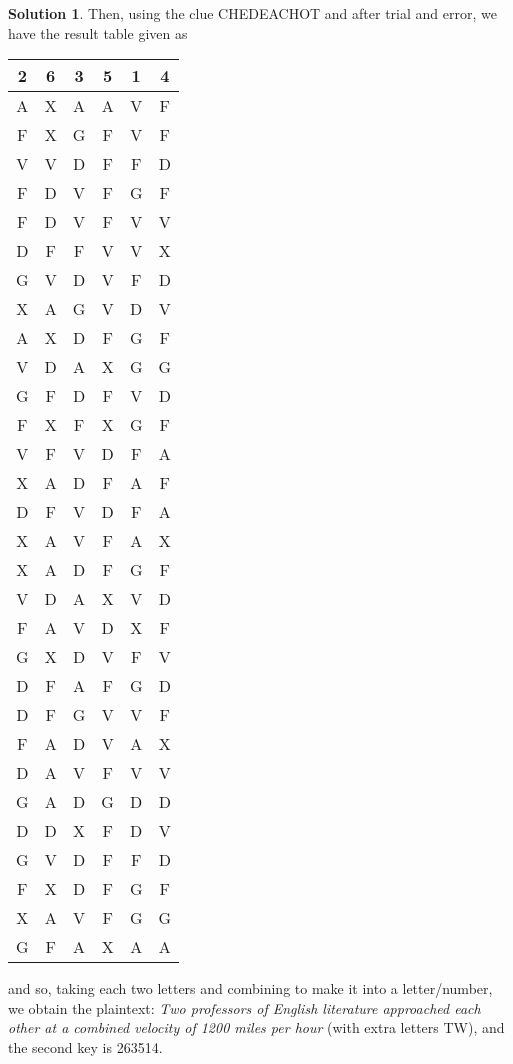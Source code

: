 \documentclass[11pt]{article}
\theoremstyle{definition}\newtheorem{definition}{Definition}
\theoremstyle{definition}\newtheorem{question}{Question}
\theoremstyle{definition}\newtheorem*{solution}{Solution}
\begin{document}
\begin{solution}
    Then, using the clue CHEDEACHOT and after trial and error, we have the result table given as
    \begin{center}
        \begin{tabular}{cccccc}
            2 & 6 & 3 & 5 & 1 & 4 \\ \hline
            A & X & A & A & V & F \\
            F & X & G & F & V & F \\
            V & V & D & F & F & D \\
            F & D & V & F & G & F \\
            F & D & V & F & V & V \\
            D & F & F & V & V & X \\
            G & V & D & V & F & D \\
            X & A & G & V & D & V \\
            A & X & D & F & G & F \\
            V & D & A & X & G & G \\
            G & F & D & F & V & D \\
            F & X & F & X & G & F \\
            V & F & V & D & F & A \\
            X & A & D & F & A & F \\
            D & F & V & D & F & A \\
            X & A & V & F & A & X \\
            X & A & D & F & G & F \\
            V & D & A & X & V & D \\
            F & A & V & D & X & F \\
            G & X & D & V & F & V \\
            D & F & A & F & G & D \\
            D & F & G & V & V & F \\
            F & A & D & V & A & X \\
            D & A & V & F & V & V \\
            G & A & D & G & D & D \\
            D & D & X & F & D & V \\
            G & V & D & F & F & D \\
            F & X & D & F & G & F \\
            X & A & V & F & G & G \\
            G & F & A & X & A & A
        \end{tabular}
    \end{center}
    and so, taking each two letters and combining to make it into a letter/number, we obtain the plaintext: \emph{Two professors of English literature approached each other at a combined velocity of 1200 miles per hour} (with extra letters TW), and the second key is 263514.
\end{solution}
\end{document}
